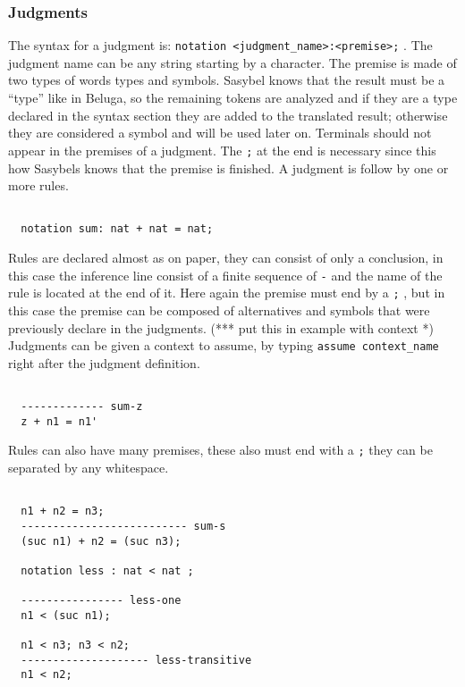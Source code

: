\documentclass[12pt]{article}
\begin{document}
\subsubsection{Judgments}
The syntax for a judgment is: {\tt notation <judgment\_name>:<premise>;} . The judgment name can be any string starting by a character. The premise is made of two types of words types and symbols. \textmd{Sasybel}
knows that the result must be a ``type'' like in \textmd{Beluga}, so the remaining tokens are analyzed and if they are a type declared in the syntax section
they are added to the translated result; otherwise they are considered a symbol and will be used later on. Terminals should not appear in the premises of a judgment. The {\tt ;} at the end is necessary since this how Sasybels
knows that the premise is finished. A judgment is follow by one or more rules.
\begin{verbatim}

  notation sum: nat + nat = nat;

\end{verbatim}
Rules are declared almost as on paper, they can consist of only a conclusion, in this case the inference line consist of a finite sequence of {\tt -} and the name of the rule is located at the end of it. Here again the premise
must end by a {\tt ;} , but in this case the premise can be composed of alternatives and symbols that were previously declare in the judgments.
(*** put this in example with context *) Judgments can be given a context to assume, by typing {\tt assume context\_name} right after the judgment definition.
\begin{verbatim}

  ------------- sum-z
  z + n1 = n1'

\end{verbatim}
Rules can also have many premises, these also must end with a {\tt ;} they can be separated by any whitespace.
\begin{verbatim}

  n1 + n2 = n3;
  -------------------------- sum-s
  (suc n1) + n2 = (suc n3);

  notation less : nat < nat ;

  ---------------- less-one
  n1 < (suc n1);

  n1 < n3; n3 < n2;
  -------------------- less-transitive
  n1 < n2;

\end{verbatim}
\end{document}
